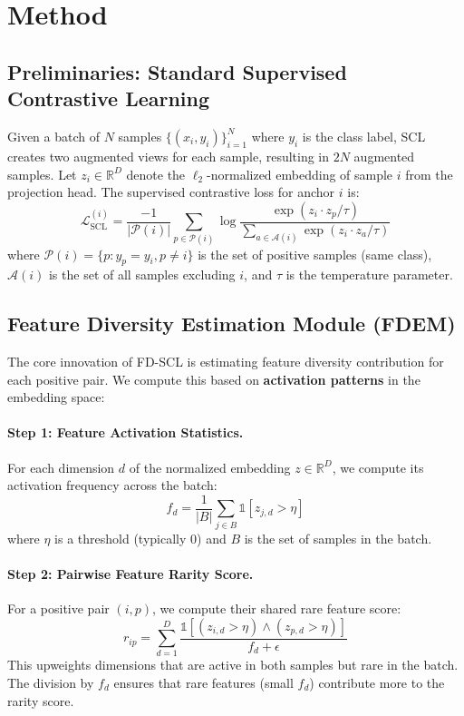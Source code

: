\documentclass[11pt,a4paper]{article}
\newcommand{\R}{\mathbb{R}}
\newcommand{\cL}{\mathcal{L}}
\newcommand{\cA}{\mathcal{A}}
\newcommand{\cP}{\mathcal{P}}
\begin{document}
\section{Method}

\subsection{Preliminaries: Standard Supervised Contrastive Learning}

Given a batch of $N$ samples $\{(x_i, y_i)\}_{i=1}^N$ where $y_i$ is the class label, SCL creates two augmented views for each sample, resulting in $2N$ augmented samples. Let $z_i \in \R^D$ denote the $\ell_2$-normalized embedding of sample $i$ from the projection head. The supervised contrastive loss for anchor $i$ is:
\begin{equation}
\cL_{\text{SCL}}^{(i)} = \frac{-1}{|\cP(i)|} \sum_{p \in \cP(i)} \log \frac{\exp(z_i \cdot z_p / \tau)}{\sum_{a \in \cA(i)} \exp(z_i \cdot z_a / \tau)}
\end{equation}
where $\cP(i) = \{p : y_p = y_i, p \neq i\}$ is the set of positive samples (same class), $\cA(i)$ is the set of all samples excluding $i$, and $\tau$ is the temperature parameter.

\subsection{Feature Diversity Estimation Module (FDEM)}

The core innovation of FD-SCL is estimating feature diversity contribution for each positive pair. We compute this based on \textbf{activation patterns} in the embedding space:

\paragraph{Step 1: Feature Activation Statistics.}
For each dimension $d$ of the normalized embedding $z \in \R^D$, we compute its activation frequency across the batch:
\begin{equation}
f_d = \frac{1}{|B|} \sum_{j \in B} \mathbb{1}[z_{j,d} > \eta]
\end{equation}
where $\eta$ is a threshold (typically 0) and $B$ is the set of samples in the batch.

\paragraph{Step 2: Pairwise Feature Rarity Score.}
For a positive pair $(i, p)$, we compute their shared rare feature score:
\begin{equation}
r_{ip} = \sum_{d=1}^D \frac{\mathbb{1}[(z_{i,d} > \eta) \land (z_{p,d} > \eta)]}{f_d + \epsilon}
\end{equation}
This upweights dimensions that are active in both samples but rare in the batch. The division by $f_d$ ensures that rare features (small $f_d$) contribute more to the rarity score.
\end{document}
